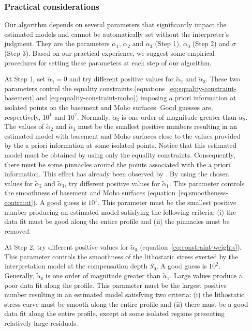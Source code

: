 \documentclass[manuscript]{geophysics}
\begin{document}
\subsubsection*{Practical considerations}

Our algorithm depends on several parameters that significantly impact the estimated models
and cannot be automatically set without the interpreter’s judgment.
They are the parameters $\tilde{\alpha}_{1}$, $\tilde{\alpha}_{2}$ and $\tilde{\alpha}_{3}$
(Step 1), $\tilde{\alpha}_{0}$ (Step 2) and $\sigma$ (Step 3).
Based on our practical experience, we suggest
some empirical procedures for setting these parameters at each step of our algorithm.

At Step 1, set $\tilde{\alpha}_{1} = 0$ and try different positive values for 
$\tilde{\alpha}_{2}$ and $\tilde{\alpha}_{3}$. 
These two parameters control the equality constraints
(equations~\ref{eq:equality-constraint-basement} and \ref{eq:equality-constraint-moho})
imposing a priori information at isolated points on the basement and Moho surfaces.
Good guesses are, respectively,
$10^{1}$ and $10^{2}$. Normally, $\tilde{\alpha}_{3}$ is one order of magnitude greater
than $\tilde{\alpha}_{2}$.
The values of $\tilde{\alpha}_{2}$ and $\tilde{\alpha}_{3}$ 
must be the smallest positive numbers resulting in an estimated model with
basement and Moho surfaces close to the values provided by the a priori information
at some isolated points. Notice that this estimated model must be obtained 
by using only the equality constraints. Consequently, there must be some
pinnacles around the points associated with the a priori information. This effect
has already been observed by \citet{barbosa-etal1997}.
By using the chosen values for $\tilde{\alpha}_{2}$ and $\tilde{\alpha}_{3}$, 
try different positive values for $\tilde{\alpha}_{1}$. 
This parameter controls the smoothness of basement and Moho surfaces
(equation~\ref{eq:smootheness-contraint}).
A good guess is $10^{1}$.
This parameter must be the smallest positive number producing an estimated model
satisfying the following criteria: (i) the data fit must be good along the entire profile
and (ii) the pinnacles must be removed. 

At Step 2, try different positive values for $\tilde{\alpha}_{0}$ 
(equation~\ref{eq:constraint-weights}). This parameter
controls the smoothness of the lithostatic stress exerted by the interpretation model
at the compensation depth $S_{0}$. A good guess is $10^{2}$.
Generally, $\tilde{\alpha}_{0}$ is one order of magnitude greater than
$\tilde{\alpha}_{1}$. Large values produce a poor data fit along the profile.
This parameter must be the largest positive number resulting in an estimated
model satisfying two criteria: (i) the lithostatic stress curve must be smooth
along the entire profile and (ii) there must be a good data fit along the entire
profile, except at some isolated regions presenting relatively large residuals.
\end{document}
